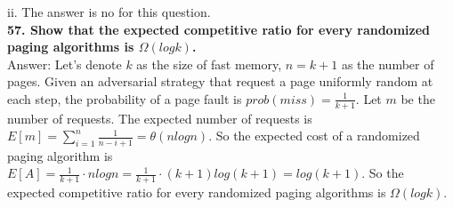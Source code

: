 \documentclass{article}
\begin{document}
ii. The answer is no for this question. \\ \newline
\textbf{57. Show that the expected competitive ratio for every randomized paging algorithms is
$\Omega(logk)$.}\\ \newline
Answer: Let's denote $k$ as the size of fast memory, $n = k + 1$ as the number of pages. Given an adversarial strategy that request a page uniformly random at each step, the probability of a page fault is $prob(miss) = \frac{1}{k + 1}$. Let $m$ be the number of requests. The expected number of requests is $E[m] = \sum_{i=1}^{n}\frac{1}{n-i+1} = \theta(nlogn)$. So the expected cost of a randomized paging algorithm is $E[A] = \frac{1}{k+1} \cdot nlogn = \frac{1}{k+ 1}\cdot (k+1)log(k+1) = log(k+1)$. So the expected competitive ratio for every randomized paging algorithms is $\Omega(logk)$.
\end{document}
